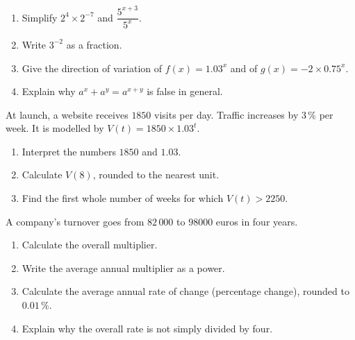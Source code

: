 
\begin{exercice}
\begin{enumerate}
\item Simplify $2^4\times2^{-7}$ and $\dfrac{5^{x+3}}{5^x}$.
\item Write $3^{-2}$ as a fraction.
\item Give the direction of variation of $f(x)=1.03^x$ and of $g(x)=-2\times0.75^x$.
\item Explain why $a^x+a^y=a^{x+y}$ is false in general.
\end{enumerate}
\end{exercice}
\begin{exercice}
At launch, a website receives $1850$ visits per day. Traffic increases by $3\,\%$ per week. It is modelled by $V(t)=1850\times1.03^t$.
\begin{enumerate}
\item Interpret the numbers $1850$ and $1.03$.
\item Calculate $V(8)$, rounded to the nearest unit.
\item Find the first whole number of weeks for which $V(t)>2250$.
\end{enumerate}
\end{exercice}
\begin{exercice}
A company's turnover goes from $82\,000$ to $98000$ euros in four years.
\begin{enumerate}
\item Calculate the overall multiplier.
\item Write the average annual multiplier as a power.
\item Calculate the average annual rate of change (percentage change), rounded to $0.01\,\%$.
\item Explain why the overall rate is not simply divided by four.
\end{enumerate}
\end{exercice}

